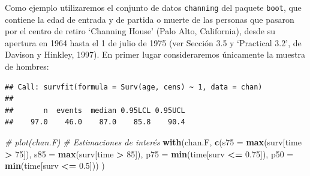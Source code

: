 \documentclass[]{book}
\newenvironment{Shaded}{\begin{snugshade}}{\end{snugshade}}
\newcommand{\KeywordTok}[1]{\textcolor[rgb]{0.13,0.29,0.53}{\textbf{#1}}}
\newcommand{\DataTypeTok}[1]{\textcolor[rgb]{0.13,0.29,0.53}{#1}}
\newcommand{\DecValTok}[1]{\textcolor[rgb]{0.00,0.00,0.81}{#1}}
\newcommand{\FloatTok}[1]{\textcolor[rgb]{0.00,0.00,0.81}{#1}}
\newcommand{\StringTok}[1]{\textcolor[rgb]{0.31,0.60,0.02}{#1}}
\newcommand{\CommentTok}[1]{\textcolor[rgb]{0.56,0.35,0.01}{\textit{#1}}}
\newcommand{\OperatorTok}[1]{\textcolor[rgb]{0.81,0.36,0.00}{\textbf{#1}}}
\newcommand{\NormalTok}[1]{#1}
\theoremstyle{definition}
\theoremstyle{definition}
\theoremstyle{definition}
\theoremstyle{remark}
\begin{document}
Como ejemplo utilizaremos el conjunto de datos \texttt{channing} del
paquete \texttt{boot}, que contiene la edad de entrada y de partida o
muerte de las personas que pasaron por el centro de retiro `Channing
House' (Palo Alto, California), desde su apertura en 1964 hasta el 1 de
julio de 1975 (ver Sección 3.5 y `Practical 3.2', de Davison y Hinkley,
1997). En primer lugar consideraremos únicamente la muestra de hombres:

\begin{Shaded}
\end{Shaded}

\begin{verbatim}
## Call: survfit(formula = Surv(age, cens) ~ 1, data = chan)
## 
##       n  events  median 0.95LCL 0.95UCL 
##    97.0    46.0    87.0    85.8    90.4
\end{verbatim}

\begin{Shaded}
\begin{Highlighting}[]
\CommentTok{# plot(chan.F)}
\CommentTok{# Estimaciones de interés}
\KeywordTok{with}\NormalTok{(chan.F, }
    \KeywordTok{c}\NormalTok{(}\DataTypeTok{s75 =} \KeywordTok{max}\NormalTok{(surv[time }\OperatorTok{>}\StringTok{ }\DecValTok{75}\NormalTok{]), }\DataTypeTok{s85 =} \KeywordTok{max}\NormalTok{(surv[time }\OperatorTok{>}\StringTok{ }\DecValTok{85}\NormalTok{]),}
      \DataTypeTok{p75 =} \KeywordTok{min}\NormalTok{(time[surv }\OperatorTok{<=}\StringTok{ }\FloatTok{0.75}\NormalTok{]), }\DataTypeTok{p50 =} \KeywordTok{min}\NormalTok{(time[surv }\OperatorTok{<=}\StringTok{ }\FloatTok{0.5}\NormalTok{])) }
\NormalTok{)}
\end{Highlighting}
\end{Shaded}
\end{document}
